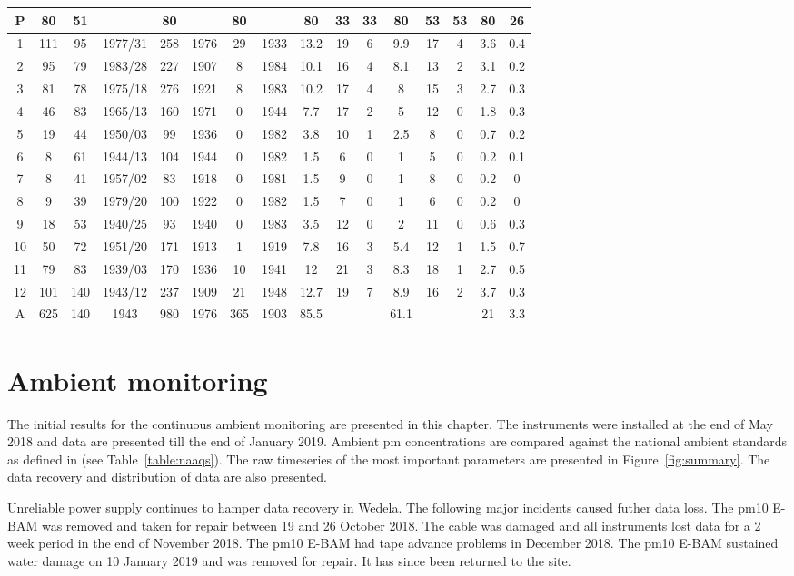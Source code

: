 \documentclass{nwureport}
\begin{document}
\begin{table}
\begin{center}
\begin{tabular}{ c c c c c c c c c c c c c c c c }
\midrule 
P&80&51&&80&&80&&80&33&33&80&53&53&80&26\\
\midrule 
1&111&95&1977/31&258&1976&29&1933&13.2&19&6&9.9&17&4&3.6&0.4\\
2&95&79&1983/28&227&1907&8&1984&10.1&16&4&8.1&13&2&3.1&0.2\\
3&81&78&1975/18&276&1921&8&1983&10.2&17&4&8&15&3&2.7&0.3\\
4&46&83&1965/13&160&1971&0&1944&7.7&17&2&5&12&0&1.8&0.3\\
5&19&44&1950/03&99&1936&0&1982&3.8&10&1&2.5&8&0&0.7&0.2\\
6&8&61&1944/13&104&1944&0&1982&1.5&6&0&1&5&0&0.2&0.1\\
7&8&41&1957/02&83&1918&0&1981&1.5&9&0&1&8&0&0.2&0\\
8&9&39&1979/20&100&1922&0&1982&1.5&7&0&1&6&0&0.2&0\\
9&18&53&1940/25&93&1940&0&1983&3.5&12&0&2&11&0&0.6&0.3\\
10&50&72&1951/20&171&1913&1&1919&7.8&16&3&5.4&12&1&1.5&0.7\\
11&79&83&1939/03&170&1936&10&1941&12&21&3&8.3&18&1&2.7&0.5\\
12&101&140&1943/12&237&1909&21&1948&12.7&19&7&8.9&16&2&3.7&0.3\\
\midrule 
A&625&140&1943&980&1976&365&1903&85.5&&&61.1&&&21&3.3\\
\bottomrule
\end{tabular}
\end{center}
\end{table}


\chapter{Ambient monitoring}
\label{sec:ambient}

The initial results for the continuous ambient monitoring are presented in this chapter. The instruments were installed at the end of May 2018 and data are presented till the end of January 2019. Ambient \gls{pm} concentrations are compared against the national ambient standards as defined in \cite{RSA2009a} (see Table~\ref{table:naaqs}). The raw timeseries of the most important parameters are presented in Figure~\ref{fig:summary}. The data recovery and distribution of data are also presented.

Unreliable power supply continues to hamper data recovery in Wedela. The following major incidents caused futher data loss. The \gls{pm10} E-BAM was removed and taken for repair between 19 and 26 October 2018. The cable was damaged and all instruments lost data for a 2 week period in the end of November 2018. The \gls{pm10} E-BAM had tape advance problems in December 2018. The \gls{pm10} E-BAM sustained water damage on 10 January 2019 and was removed for repair. It has since been returned to the site.
\end{document}
